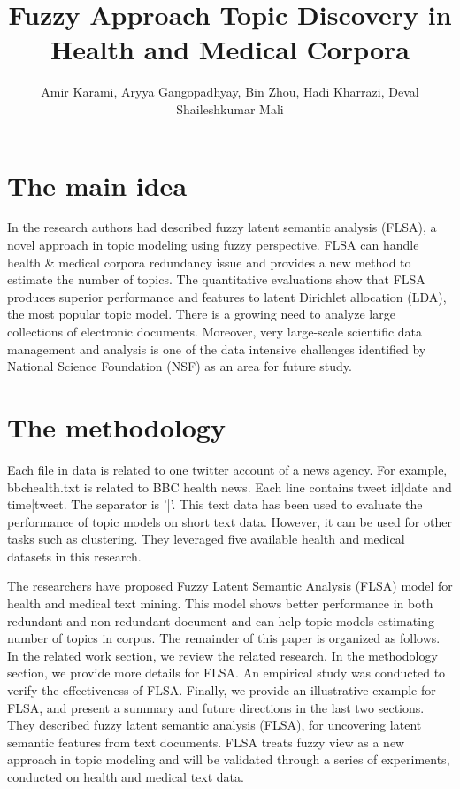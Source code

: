 \documentclass[a4paper]{article}
\title{Fuzzy Approach Topic Discovery in Health and Medical Corpora}
\author[1]{Amir Karami, Aryya Gangopadhyay, Bin Zhou, Hadi Kharrazi, Deval Shaileshkumar Mali }
\begin{document}
\maketitle
\section{The main idea}

In the research authors had described fuzzy latent semantic analysis (FLSA), a novel approach in topic modeling using fuzzy perspective. FLSA can handle health \& medical corpora redundancy issue and provides a new method to estimate the number of topics. The quantitative evaluations show that FLSA produces superior performance and features to latent Dirichlet allocation (LDA), the most popular topic model. There is a growing need to analyze large collections of electronic documents. Moreover, very large-scale scientific data management and analysis is one of the data intensive challenges identified by National Science Foundation (NSF) as an area for future study. 

\section{The methodology }

Each file in data is related to one twitter account of a news agency. For example, bbchealth.txt is related to BBC health news. Each line contains tweet id|date and time|tweet. The separator is '|'. This text data has been used to evaluate the performance of topic models on short text data. However, it can be used for other tasks such as clustering. They leveraged five available health and medical datasets in this research.

The researchers have proposed Fuzzy Latent Semantic Analysis (FLSA) model for health and medical text mining. This model shows better performance in both redundant and non-redundant document and can help topic models estimating number of topics in corpus. The remainder of this paper is organized as follows. In the related work section, we review the related research. In the methodology section, we provide more details for FLSA. An empirical study was conducted to verify the effectiveness of FLSA. Finally, we provide an illustrative example for FLSA, and present a summary and future directions in the last two sections. They described fuzzy latent semantic analysis (FLSA), for uncovering latent semantic features from text documents. FLSA treats fuzzy view as a new approach in topic modeling and will be validated through a series of experiments, conducted on health and medical text data. 
\end{document}
